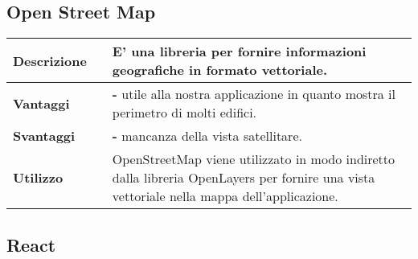 \subsection{Open Street Map}
\label{Open Street Map}
\begin{table}[H]
	\centering
	\begin{tabular}{p{2cm}p{0.5cm}p{11.5cm}}
		\arrayrulecolor{lightgray}
		\toprule
		\textbf{Descrizione} & &
		E' una libreria \js{} per fornire informazioni geografiche in formato vettoriale.
		\\ \midrule
		\textbf{Vantaggi} & &
		\textbf{- }utile alla nostra applicazione in quanto mostra il perimetro di molti edifici.
		\\ \midrule
		\textbf{Svantaggi} & &
		\textbf{- }mancanza della vista satellitare.
		\\ \midrule
		\textbf{Utilizzo} & &
		OpenStreetMap viene utilizzato in modo indiretto dalla libreria OpenLayers per fornire una vista
		vettoriale nella mappa dell'applicazione.
		\\\bottomrule
	\end{tabular}
\end{table}





\vspace{40px}
\subsection{React}
\label{React}

